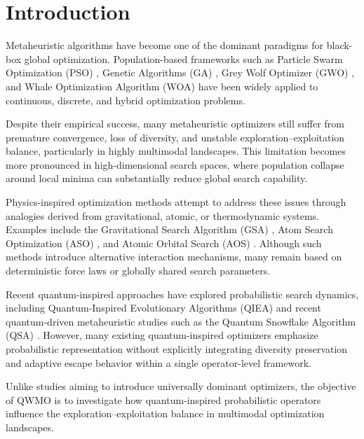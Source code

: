 \documentclass[final,5p,times,twocolumn]{elsarticle}
\begin{document}

\section{Introduction}

Metaheuristic algorithms have become one of the dominant
paradigms for black-box global optimization.
Population-based frameworks such as Particle Swarm
Optimization (PSO) \cite{kennedy1995pso}, Genetic Algorithms
(GA) \cite{goldberg1989ga}, Grey Wolf Optimizer (GWO)
\cite{mirjalili2014gwo}, and Whale Optimization Algorithm
(WOA) \cite{mirjalili2016woa} have been widely applied to
continuous, discrete, and hybrid optimization problems.

Despite their empirical success, many metaheuristic optimizers
still suffer from premature convergence, loss of diversity,
and unstable exploration--exploitation balance, particularly
in highly multimodal landscapes. This limitation becomes more
pronounced in high-dimensional search spaces, where population
collapse around local minima can substantially reduce global
search capability.

Physics-inspired optimization methods attempt to address these
issues through analogies derived from gravitational, atomic,
or thermodynamic systems. Examples include the Gravitational
Search Algorithm (GSA) \cite{rashedi2009gsa}, Atom Search
Optimization (ASO) \cite{zhao2019aso}, and Atomic Orbital
Search (AOS) \cite{azizi2021aos}. Although such methods
introduce alternative interaction mechanisms, many remain
based on deterministic force laws or globally shared search
parameters.

Recent quantum-inspired approaches have explored probabilistic
search dynamics, including Quantum-Inspired Evolutionary
Algorithms (QIEA) \cite{nowotniak2010qiea} and recent
quantum-driven metaheuristic studies such as the Quantum
Snowflake Algorithm (QSA) \cite{qsa2025}. However, many
existing quantum-inspired optimizers emphasize probabilistic
representation without explicitly integrating diversity
preservation and adaptive escape behavior within a single
operator-level framework.

Unlike studies aiming to introduce universally dominant
optimizers, the objective of QWMO is to investigate how
quantum-inspired probabilistic operators influence the
exploration--exploitation balance in multimodal optimization
landscapes.
\end{document}

